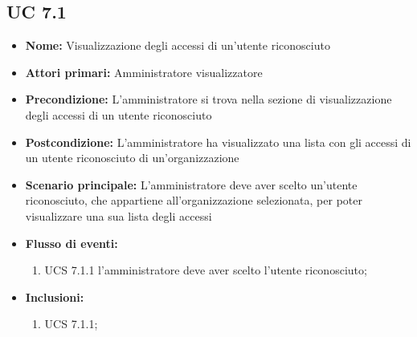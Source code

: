 \subsection{UC 7.1}%
\begin{itemize}
\item \textbf{Nome:} Visualizzazione degli accessi di un'utente riconosciuto
\item \textbf{Attori primari:} Amministratore visualizzatore
\item \textbf{Precondizione:} L'amministratore si trova nella sezione di visualizzazione degli accessi di un utente riconosciuto
\item \textbf{Postcondizione:} L'amministratore ha visualizzato una lista con gli accessi di un utente riconosciuto di un'organizzazione
\item \textbf{Scenario principale:} L'amministratore deve aver scelto un'utente riconosciuto, che appartiene all'organizzazione selezionata, per poter visualizzare una sua lista degli accessi
\item \textbf{Flusso di eventi:} 
	\begin{enumerate}
		\item UCS 7.1.1 l'amministratore deve aver scelto l'utente riconosciuto;
	\end{enumerate}
\item \textbf{Inclusioni:}
\begin{enumerate}
	\item UCS 7.1.1;
\end{enumerate}
\end{itemize}

